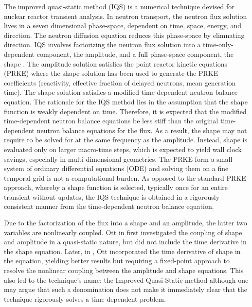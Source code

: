 \documentclass{elsarticle}
\begin{document}
The improved quasi-static method (IQS) is a numerical technique devised for nuclear reactor transient analysis. In neutron transport, the neutron flux solution lives in a seven dimensional phase-space, dependent on time, space, energy, and direction. The neutron diffusion equation reduces this phase-space by elimnating direction. IQS involves factorizing the neutron flux solution into a time-only-dependent component, the amplitude, and a full phase-space component, the shape \cite{Ott_1966,Devooght_1984,Monier_diss,Sissaoui_1995,Dulla2008}. The amplitude solution satisfies the point reactor kinetic equations (PRKE) where the shape solution has been used to generate the PRKE coefficients (reactivity, effective fraction of delayed neutrons, mean generation time). The shape solution satisfies a modified time-dependent neutron balance equation. The rationale for the IQS method lies in the assumption that the shape function is weakly dependent on time. Therefore, it is expected that the modified time-dependent neutron balance equations be less stiff than the original time-dependent neutron balance equations for the flux. As a result, the shape may not require to be solved for at the same frequency as the amplitude. Instead, shape is evaluated only on larger macro-time steps, which is expected to yield wall clock savings, especially in multi-dimensional geometries. The PRKE form a small system of ordinary differential equations (ODE) and solving them on a fine temporal grid is not a computational burden. As opposed to the standard PRKE approach, whereby a shape function is selected, typically once for an entire transient without updates, the IQS technique is obtained in a rigorously consistent manner from the time-dependent neutron balance equation.

Due to the factorization of the flux into a shape and an amplitude, the latter two variables are nonlinearly coupled. Ott in \cite{Ott_1966} first investigated the coupling of shape and amplitude in a quasi-static nature, but did not include the time derivative in the shape equation. Later, in \cite{Ott_1969}, Ott incorporated the time derivative of shape in the equation, yielding better results but requiring a fixed-point approach to resolve the nonlinear coupling between the amplitude and shape equations. This also led to the technique's name: the Improved Quasi-Static method although one may argue that such a denomination does not make it immediately clear that the technique rigorously solves a time-dependent problem. 
\end{document}
